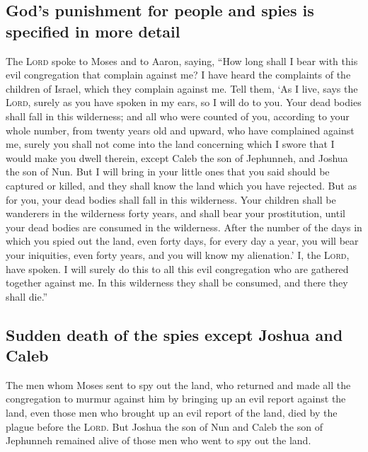 \hypertarget{gods-punishment-for-people-and-spies-is-specified-in-more-detail}{%
\subsection{God's punishment for people and spies is specified in more
detail}\label{gods-punishment-for-people-and-spies-is-specified-in-more-detail}}

 The \textsc{Lord} spoke to Moses and to Aaron, saying,
 ``How long shall I bear with this evil congregation that
complain against me? I have heard the complaints of the children of
Israel, which they complain against me.  Tell them, `As I
live, says the \textsc{Lord}, surely as you have spoken in my ears, so I
will do to you.  Your dead bodies shall fall in this
wilderness; and all who were counted of you, according to your whole
number, from twenty years old and upward, who have complained against
me,  surely you shall not come into the land concerning
which I swore that I would make you dwell therein, except Caleb the son
of Jephunneh, and Joshua the son of Nun.  But I will
bring in your little ones that you said should be captured or killed,
and they shall know the land which you have rejected. 
But as for you, your dead bodies shall fall in this wilderness.
 Your children shall be wanderers in the wilderness forty
years, and shall bear your prostitution, until your dead bodies are
consumed in the wilderness.  After the number of the days
in which you spied out the land, even forty days, for every day a year,
you will bear your iniquities, even forty years, and you will know my
alienation.'  I, the \textsc{Lord}, have spoken. I will
surely do this to all this evil congregation who are gathered together
against me. In this wilderness they shall be consumed, and there they
shall die.''

\hypertarget{sudden-death-of-the-spies-except-joshua-and-caleb}{%
\subsection{Sudden death of the spies except Joshua and
Caleb}\label{sudden-death-of-the-spies-except-joshua-and-caleb}}

 The men whom Moses sent to spy out the land, who
returned and made all the congregation to murmur against him by bringing
up an evil report against the land,  even those men who
brought up an evil report of the land, died by the plague before the
\textsc{Lord}.  But Joshua the son of Nun and Caleb the
son of Jephunneh remained alive of those men who went to spy out the
land.

